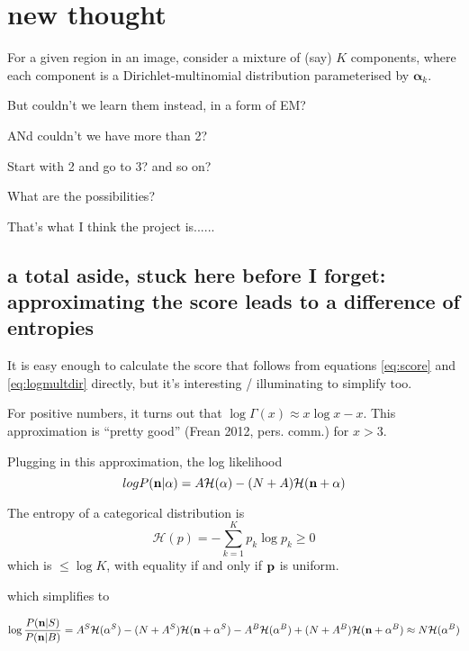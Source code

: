 \documentclass[11pt]{article}
\begin{document}
\section{new thought}
For a given region in an image, consider a mixture of (say) $K$
components, where each component is a Dirichlet-multinomial
distribution parameterised by $\boldsymbol{\alpha}_k$.  

But couldn't we learn them instead, in a form of EM?

ANd couldn't we have more than 2?

Start with 2 and go to 3? and so on?

What are the possibilities? 

That's what I think the project is......


\subsection{a total aside, stuck here before I forget: approximating the score leads to a difference of entropies}

It is easy enough to calculate the score that follows from equations
\ref{eq:score} and \ref{eq:logmultdir} directly, but it's interesting
/ illuminating to simplify too.

For positive numbers, it turns out that $\log \Gamma(x) \approx x \log
x - x $.  This approximation is ``pretty good'' (Frean 2012,
pers. comm.) for $x>3$. 

Plugging in this approximation, the log likelihood
\begin{equation}
log P(\mathbf{n}|\alpha) = A \mathcal{H}(\alpha) - (N+A)\mathcal{H}(\mathbf{n}+\alpha)
\end{equation}

The entropy  of a categorical distribution is
\begin{equation}
\mathcal{H}(p) = - \sum_{k=1}^K p_k \log p_k \geq 0
\end{equation}
which is $\leq \log K$, with equality if and only if $\mathbf{p}$ is uniform.

which simplifies to

\begin{equation}
\log \frac{P(\mathbf{n}|S)}{P(\mathbf{n}|B)} = A^S\mathcal{H}(\alpha^S) - (N+A^S)\mathcal{H}(\mathbf{n}+\alpha^S) - A^B\mathcal{H}(\alpha^B) + (N+A^B)\mathcal{H}(\mathbf{n}+\alpha^B) \approx N\mathcal{H}(\alpha^B)
\label{eq:approxscore}
\end{equation}
\end{document}
